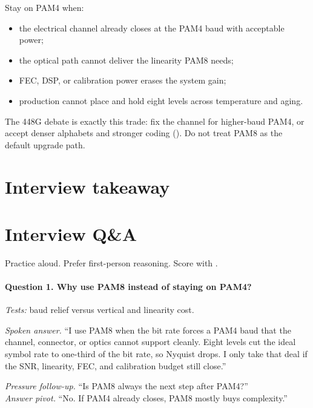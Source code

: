 Stay on PAM4 when:

\begin{itemize}
\item the electrical channel already closes at the PAM4 baud with acceptable
      power;
\item the optical path cannot deliver the linearity PAM8 needs;
\item FEC, DSP, or calibration power erases the system gain;
\item production cannot place and hold eight levels across temperature and
      aging.
\end{itemize}

The 448G debate is exactly this trade: fix the channel for higher-baud PAM4, or
accept denser alphabets and stronger coding (). Do
not treat PAM8 as the default upgrade path.

\section{Interview takeaway}
\label{sec:multilevel-design-review}


\section{Interview Q\&A}
\label{sec:multilevel-interview-qa}

Practice aloud. Prefer first-person reasoning. Score with
.

\paragraph{Question 1. Why use PAM8 instead of staying on PAM4?}
\textit{Tests:} baud relief versus vertical and linearity cost.

\textit{Spoken answer.}
``I use PAM8 when the bit rate forces a PAM4 baud that the channel, connector,
or optics cannot support cleanly. Eight levels cut the ideal symbol rate to
one-third of the bit rate, so Nyquist drops. I only take that deal if the SNR,
linearity, FEC, and calibration budget still close.''

\textit{Pressure follow-up.} ``Is PAM8 always the next step after PAM4?''\\
\textit{Answer pivot.} ``No. If PAM4 already closes, PAM8 mostly buys
complexity.''

